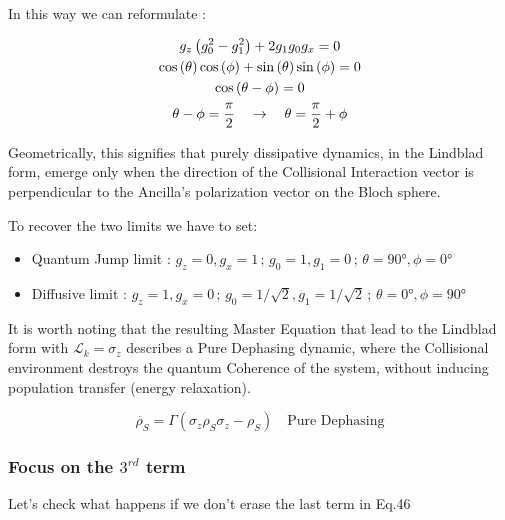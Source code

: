 \documentclass[a4paper,12pt]{article}
\begin{document}
	  In this way we can reformulate :
	  
	  \begin{gather}
	  	g_{z}\left(g_{0}^{2} - g_{1}^{2} \right) + 2 g_{1} g_{0} g_{x} = 0 \notag \\
	  	\cos{(\theta)}\cos{(\phi)} + \sin{(\theta)}\sin{(\phi)} = 0 \notag \\
	  	\cos{(\theta - \phi)} = 0 \notag \\
	  	\theta - \phi = \frac{\pi}{2} \quad \rightarrow \quad \theta = \frac{\pi}{2} + \phi
	  \end{gather}
	  
	  Geometrically, this signifies that purely dissipative dynamics, in the Lindblad form, emerge only when the direction of the Collisional Interaction vector is perpendicular to the Ancilla's polarization vector on the Bloch sphere.

	  \newpage
	
	  To recover the two limits we have to set: 
	  
	  \begin{itemize}
	  	\item Quantum Jump limit : $ g_z = 0 , g_x = 1 \, ; \, g_0 = 1 , g_1 = 0 \, ; \, \theta = 90° , \phi = 0° $
	  	\item Diffusive limit : $ g_z = 1 , g_x = 0 \, ; \, g_0 = 1/\sqrt{2} , g_1 = 1/\sqrt{2} \, ; \, \theta = 0° , \phi = 90° $
	  \end{itemize}
	  
	  It is worth noting that the resulting Master Equation that lead to the Lindblad form with $ \mathcal{L}_k = \sigma_{z} $ describes a Pure Dephasing dynamic, where the Collisional environment destroys the quantum Coherence of the system, without inducing population transfer (energy relaxation).

	  \begin{equation}
	  	\dot{\rho_S} = \Gamma \left(\sigma_{z} \rho_S \sigma_{z} - \rho_S \right) \quad \text{Pure Dephasing}
	  \end{equation}
	  
	  \subsubsection{Focus on the $ 3^{rd} $ term}
	  Let's check what happens if we don't erase the last term in Eq.46 
	  
\end{document}
